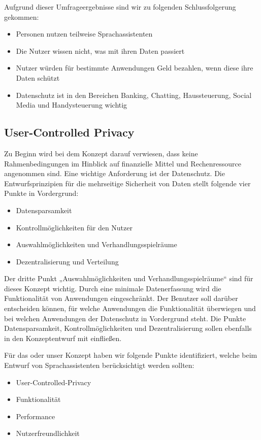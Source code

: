 Aufgrund dieser Umfrageergebnisse sind wir zu folgenden Schlussfolgerung gekommen:
\begin{itemize}

\item Personen nutzen teilweise Sprachassistenten
\item Die Nutzer wissen nicht, was mit ihren Daten passiert
\item Nutzer würden für bestimmte Anwendungen Geld bezahlen, wenn diese ihre Daten schützt
\item Datenschutz ist in den Bereichen Banking, Chatting, Haussteuerung, Social Media und Handysteuerung wichtig
	
	
\end{itemize}

\subsection{User-Controlled Privacy}

Zu Beginn wird bei dem Konzept darauf verwiesen, dass keine Rahmenbedingungen im Hinblick auf finanzielle Mittel und Rechenressource angenommen sind.
Eine wichtige Anforderung ist der Datenschutz. Die Entwurfsprinzipien für die mehrseitige Sicherheit von Daten stellt folgende vier Punkte in Vordergrund\cite{kairannenberg}:

\begin{itemize}
\item Datensparsamkeit
\item Kontrollmöglichkeiten für den Nutzer 
\item Auswahlmöglichkeiten und Verhandlungsspielräume 
\item Dezentralisierung und Verteilung

\end{itemize}
Der dritte Punkt „Auswahlmöglichkeiten und Verhandlungsspielräume“ sind für dieses Konzept wichtig. Durch eine minimale Datenerfassung wird die Funktionalität von Anwendungen eingeschränkt. Der Benutzer soll darüber entscheiden können, für welche Anwendungen die Funktionalität überwiegen und bei welchen Anwendungen der Datenschutz in Vordergrund steht. Die Punkte Datensparsamkeit, Kontrollmöglichkeiten und Dezentralisierung sollen ebenfalls in den Konzeptentwurf mit einfließen.

Für das oder unser Konzept haben wir folgende Punkte identifiziert, welche beim Entwurf von Sprachassistenten berücksichtigt werden sollten:

\begin{itemize}
\item User-Controlled-Privacy
\item Funktionalität
\item Performance
\item Nutzerfreundlichkeit	
\end{itemize}

